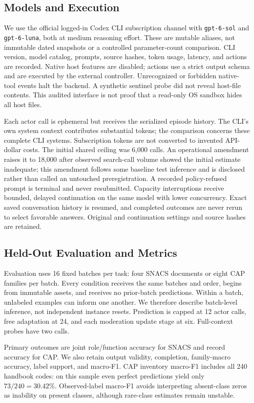 \documentclass[11pt]{article}
\begin{document}
\subsection{Models and Execution}
We use the official logged-in Codex CLI subscription channel with \texttt{gpt-6-sol} and \texttt{gpt-6-luna}, both at medium reasoning effort. These are mutable aliases, not immutable dated snapshots or a controlled parameter-count comparison. CLI version, model catalog, prompts, source hashes, token usage, latency, and actions are recorded. Native host features are disabled; actions use a strict output schema and are executed by the external controller. Unrecognized or forbidden native-tool events halt the backend. A synthetic sentinel probe did not reveal host-file contents. This audited interface is not proof that a read-only OS sandbox hides all host files.

Each actor call is ephemeral but receives the serialized episode history. The CLI's own system context contributes substantial tokens; the comparison concerns these complete CLI systems. Subscription tokens are not converted to invented API-dollar costs. The initial shared ceiling was 6,000 calls. An operational amendment raises it to 18,000 after observed search-call volume showed the initial estimate inadequate; this amendment follows some baseline test inference and is disclosed rather than called an untouched preregistration. A recorded policy-refused prompt is terminal and never resubmitted. Capacity interruptions receive bounded, delayed continuation on the same model with lower concurrency. Exact saved conversation history is resumed, and completed outcomes are never rerun to select favorable answers. Original and continuation settings and source hashes are retained.

\subsection{Held-Out Evaluation and Metrics}
Evaluation uses 16 fixed batches per task: four SNACS documents or eight CAP families per batch. Every condition receives the same batches and order, begins from immutable assets, and receives no prior-batch predictions. Within a batch, unlabeled examples can inform one another. We therefore describe batch-level inference, not independent instance resets. Prediction is capped at 12 actor calls, free adaptation at 24, and each moderation update stage at six. Full-context probes have two calls.

Primary outcomes are joint role/function accuracy for SNACS and record accuracy for CAP. We also retain output validity, completion, family-macro accuracy, label support, and macro-F1. CAP inventory macro-F1 includes all 240 handbook codes: on this sample even perfect predictions yield only $73/240=30.42\%$. Observed-label macro-F1 avoids interpreting absent-class zeros as inability on present classes, although rare-class estimates remain unstable.
\end{document}
